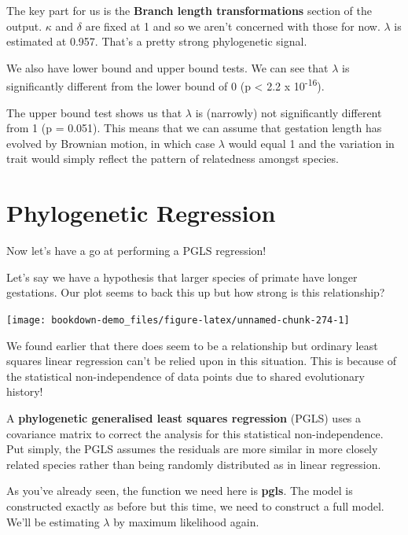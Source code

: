 \documentclass[
]{book}
\begin{document}
The key part for us is the \textbf{Branch length transformations} section of the output. \(\kappa\) and \(\delta\) are fixed at 1 and so we aren't concerned with those for now. \(\lambda\) is estimated at 0.957. That's a pretty strong phylogenetic signal.

We also have lower bound and upper bound tests. We can see that \(\lambda\) is significantly different from the lower bound of 0 (p \textless{} 2.2 x 10\textsuperscript{-16}).

The upper bound test shows us that \(\lambda\) is (narrowly) not significantly different from 1 (p = 0.051). This means that we can assume that gestation length has evolved by Brownian motion, in which case \(\lambda\) would equal 1 and the variation in trait would simply reflect the pattern of relatedness amongst species.

\hypertarget{phylogenetic-regression}{%
\section{Phylogenetic Regression}\label{phylogenetic-regression}}

Now let's have a go at performing a PGLS regression!

Let's say we have a hypothesis that larger species of primate have longer gestations. Our plot seems to back this up but how strong is this relationship?

\begin{center}\texttt{[image: bookdown-demo\_files/figure-latex/unnamed-chunk-274-1]} \end{center}

We found earlier that there does seem to be a relationship but ordinary least squares linear regression can't be relied upon in this situation. This is because of the statistical non-independence of data points due to shared evolutionary history!

A \textbf{phylogenetic generalised least squares regression} (PGLS) uses a covariance matrix to correct the analysis for this statistical non-independence. Put simply, the PGLS assumes the residuals are more similar in more closely related species rather than being randomly distributed as in linear regression.

As you've already seen, the function we need here is \textbf{pgls}. The model is constructed exactly as before but this time, we need to construct a full model. We'll be estimating \(\lambda\) by maximum likelihood again.
\end{document}
